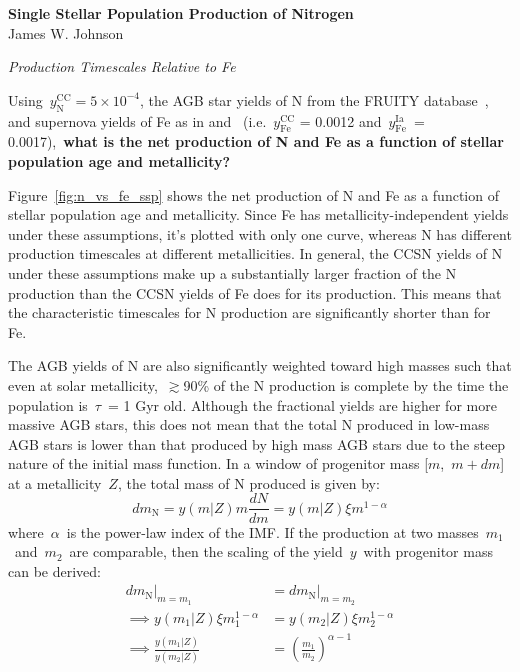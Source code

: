 \documentclass[12pt]{report}
\begin{document}
 
\begin{center} 
\textbf{{\Large Single Stellar Population Production of Nitrogen}} \\ 
James W. Johnson 
\end{center} 

\noindent 
{\Large \textit{Production Timescales Relative to Fe}} 
\par\noindent 
Using~$y_\text{N}^\text{CC} = 5\times10^{-4}$, the AGB star yields of N from 
the FRUITY database~\citep{Cristallo2011}, and supernova yields of Fe as in 
\citet{Johnson2020} and~\citet{Weinberg2017} (i.e.~$y_\text{Fe}^\text{CC}$ = 
0.0012 and~$y_\text{Fe}^\text{Ia}$~= 0.0017),~\textbf{what is the net 
production of N and Fe as a function of stellar population age and 
metallicity?} 
\par 
Figure~\ref{fig:n_vs_fe_ssp} shows the net production of N and Fe as a function 
of stellar population age and metallicity. Since Fe has metallicity-independent 
yields under these assumptions, it's plotted with only one curve, whereas N has 
different production timescales at different metallicities. In general, the 
CCSN yields of N under these assumptions make up a substantially larger 
fraction of the N production than the CCSN yields of Fe does for its 
production. This means that the characteristic timescales for N production are 
significantly shorter than for Fe. 
\par
The AGB yields of N are also significantly weighted toward high masses such 
that even at solar metallicity,~$\gtrsim$90\% of the N production is complete 
by the time the population is~$\tau$~= 1 Gyr old. Although the fractional 
yields are higher for more massive AGB stars, this does not mean that the 
total N produced in low-mass AGB stars is lower than that produced by high mass 
AGB stars due to the steep nature of the initial mass function. In a window of 
progenitor mass [$m$,~$m + dm$] at a metallicity~$Z$, the total mass of N 
produced is given by: 
\begin{equation} 
dm_\text{N} = y(m|Z)m\frac{dN}{dm} = y(m|Z)\xi m^{1 - \alpha} 
\end{equation} 
where~$\alpha$~is the power-law index of the IMF. If the production at two 
masses~$m_1$~and~$m_2$~are comparable, then the scaling of the yield~$y$~with 
progenitor mass can be derived: 
\begin{subequations}\begin{align} 
dm_\text{N}|_{m = m_1} &= dm_\text{N}|_{m = m_2} \\ 
\implies y(m_1|Z) \xi m_1^{1 - \alpha} &= y(m_2|Z) \xi m_2^{1 - \alpha} \\ 
\implies \frac{y(m_1|Z)}{y(m_2|Z)} &= \left(\frac{m_1}{m_2}\right)^{\alpha - 1} 
\end{align}\end{subequations} 
\end{document}
